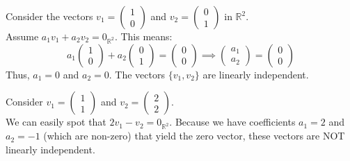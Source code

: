 \begin{example}[In $\mathbb{R}^2$]
Consider the vectors $v_1 = \begin{pmatrix} 1 \\ 0 \end{pmatrix}$ and $v_2 = \begin{pmatrix} 0 \\ 1 \end{pmatrix}$ in $\mathbb{R}^2$. \\
Assume $a_1 v_1 + a_2 v_2 = 0_{\mathbb{R}^2}$. This means:
\[
a_1 \begin{pmatrix} 1 \\ 0 \end{pmatrix} + a_2 \begin{pmatrix} 0 \\ 1 \end{pmatrix} = \begin{pmatrix} 0 \\ 0 \end{pmatrix} \implies \begin{pmatrix} a_1 \\ a_2 \end{pmatrix} = \begin{pmatrix} 0 \\ 0 \end{pmatrix}
\]
Thus, $a_1 = 0$ and $a_2 = 0$. The vectors $\{v_1, v_2\}$ are linearly independent.
\end{example}

\begin{example}
Consider $v_1 = \begin{pmatrix} 1 \\ 1 \end{pmatrix}$ and $v_2 = \begin{pmatrix} 2 \\ 2 \end{pmatrix}$. \\
We can easily spot that $2 v_1 - v_2 = 0_{\mathbb{R}^2}$. Because we have coefficients $a_1 = 2$ and $a_2 = -1$ (which are non-zero) that yield the zero vector, these vectors are NOT linearly independent.
\end{example}

